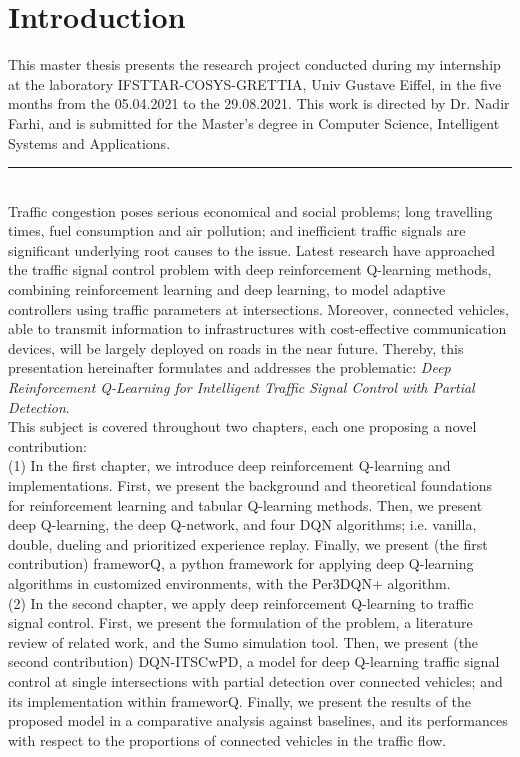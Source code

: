 \section*{Introduction}

This master thesis presents the research project conducted during my internship at the laboratory  IFSTTAR-COSYS-GRETTIA, Univ Gustave Eiffel, in the five months from the 05.04.2021 to the 29.08.2021. This work is directed by Dr. Nadir Farhi, and is submitted for the Master's degree in Computer Science, Intelligent Systems and Applications. \\

\noindent\rule{\textwidth}{1pt}
\\

Traffic congestion poses serious economical and social problems; long travelling times, fuel consumption and air pollution; and inefficient traffic signals are significant underlying root causes to the issue. Latest research have approached the traffic signal control problem with deep reinforcement Q-learning methods, combining reinforcement learning and deep learning, to model adaptive controllers using traffic parameters at intersections. Moreover, connected vehicles, able to transmit information to infrastructures with cost-effective communication devices, will be largely deployed on roads in the near future.
Thereby, this presentation hereinafter formulates and addresses the problematic: \textit{Deep Reinforcement Q-Learning for Intelligent Traffic Signal Control with Partial Detection}.\\

This subject is covered throughout two chapters, each one proposing a novel contribution: \\

(1) In the first chapter, we introduce deep reinforcement Q-learning and implementations. First, we present the background and theoretical foundations for reinforcement learning and tabular Q-learning methods. Then, we present deep Q-learning, the deep Q-network, and four DQN algorithms; i.e. vanilla, double, dueling and prioritized experience replay. Finally, we present (the first contribution) frameworQ, a python framework for applying deep Q-learning algorithms in customized environments, with the Per3DQN+ algorithm.
\\

(2) In the second chapter, we apply deep reinforcement Q-learning to traffic signal control. First, we present the formulation of the problem, a literature review of related work, and the Sumo simulation tool. Then, we present (the second contribution) DQN-ITSCwPD, a model for deep Q-learning traffic signal control at single intersections with partial detection over connected vehicles; and its implementation within frameworQ. Finally, we present the results of the proposed model in a comparative analysis against baselines, and its performances with respect to the proportions of connected vehicles in the traffic flow.
\\ 

